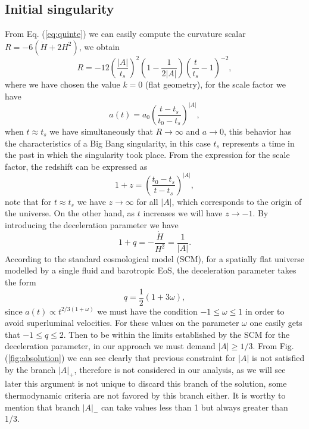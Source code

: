 \documentclass[twocolumn,showpacs,nofootinbib,floats,amsmath,amssymb]{revtex4}
\begin{document}
\subsection{Initial singularity}
From Eq. (\ref{eq:quinte}) we can easily compute the curvature scalar $R=-6(\dot{H}+2H^{2})$, we obtain
\begin{equation}
R = -12\left(\frac{\left| A\right|}{t_{s}}\right)^{2}\left(1-\frac{1}{2\left| A\right|}\right)\left(\frac{t}{t_{s}}-1\right)^{-2},
\label{eq:curvature}
\end{equation}
where we have chosen the value $k = 0$ (flat geometry), for the scale factor we have
\begin{equation}
a(t) = a_{0}\left(\frac{t-t_{s}}{t_{0}-t_{s}} \right)^{\left| A\right|},
\label{eq:scale}
\end{equation} 
when $t \approx t_{s}$ we have simultaneously that $R \rightarrow \infty$ and $a\rightarrow 0$, this behavior has the characteristics of a Big Bang singularity, in this case $t_{s}$ represents a time in the past in which the singularity took place. From the expression for the scale factor, the redshift can be expressed as
\begin{equation}
1+z =  \left(\frac{t_{0}-t_{s}}{t-t_{s}} \right)^{\left|A\right|},
\label{eq:red} 
\end{equation}
note that for $t \approx t_{s}$ we have $z\rightarrow \infty$ for all $\left|A\right|$, which corresponds to the origin of the universe. On the other hand, as $t$ increases we will have $z \rightarrow -1$. By introducing the deceleration parameter we have
\begin{equation}
1+q = -\frac{\dot{H}}{H^{2}} = \frac{1}{\left| A\right|}.
\label{eq:decel}
\end{equation}
According to the standard cosmological model (SCM), for a spatially flat universe modelled by a single fluid and barotropic EoS, the deceleration parameter takes the form
\begin{equation}
q = \frac{1}{2}(1+3\omega), 
\end{equation}
since $a(t) \propto t^{2/3(1+\omega)}$ we must have the condition $-1 \leq \omega \leq 1$ in order to avoid superluminal velocities. For these values on the parameter $\omega$ one easily gets that $-1 \leq q \leq 2$. Then to be within the limits established by the SCM for the deceleration parameter, in our approach we must demand $\left|A\right| \geq 1/3$. From Fig. (\ref{fig:absolution}) we can see clearly that previous constraint for $\left|A\right|$ is not satisfied by the branch $\left|A\right|_{+}$, therefore is not considered in our analysis, as we will see later this argument is not unique to discard this branch of the solution, some thermodynamic criteria are not favored by this branch either. It is worthy to mention that branch $\left|A\right|_{-}$ can take values less than 1 but always greater than 1/3.\\
\end{document}

